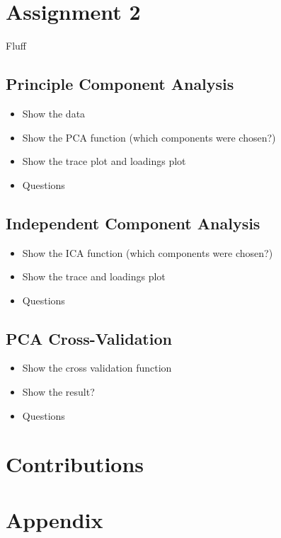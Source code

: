 \documentclass[a4paper, twocolumn]{article}
\begin{document}
    \section*{Assignment 2}
    Fluff
    \subsection*{Principle Component Analysis}
    \begin{itemize}
        \item Show the data 
        \item Show the PCA function (which components were chosen?)
        \item Show the trace plot and loadings plot
        \item Questions
    \end{itemize}
    \subsection*{Independent Component Analysis}
    \begin{itemize}
        \item Show the ICA function (which components were chosen?)
        \item Show the trace and loadings plot
        \item Questions
    \end{itemize}
    \subsection*{PCA Cross-Validation}
    \begin{itemize}
        \item Show the cross validation function
        \item Show the result?
        \item Questions
    \end{itemize}

    \section*{Contributions}

    \nocite{*} %
    
    
    \onecolumn \appendix
    \section*{Appendix}
\end{document}
